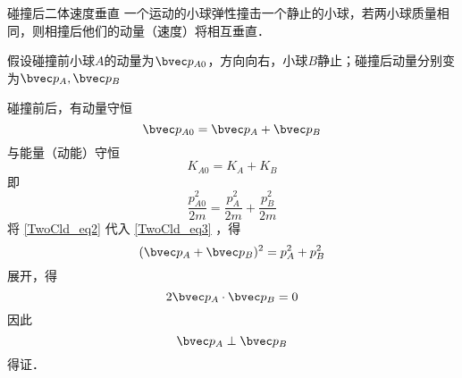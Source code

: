 \begin{example}{碰撞后二体速度垂直}
一个运动的小球弹性撞击一个静止的小球，若两小球质量相同，则相撞后他们的动量（速度）将相互垂直．

假设碰撞前小球$A$的动量为$\bvec p_{A0}$，方向向右，小球$B$静止；碰撞后动量分别变为$\bvec p_{A},\bvec p_{B}$

碰撞前后，有动量守恒
\begin{equation}\label{TwoCld_eq2}
\bvec p_{A0} = \bvec p_{A} + \bvec p_{B}
\end{equation}
与能量（动能）守恒
\begin{equation}
K_{A0} = K_{A} + K_{B}
\end{equation}
即
\begin{equation}
\frac{p_{A0}^2}{2m}=\frac{p_{A}^2}{2m}+\frac{p_{B}^2}{2m}
\end{equation}
将 \autoref{TwoCld_eq2} 代入 \autoref{TwoCld_eq3} ，得
\begin{equation}
(\bvec p_{A} + \bvec p_{B})^2=p_{A}^2+p_{B}^2
\end{equation}
展开，得
\begin{equation}
2\bvec p_{A} \cdot \bvec p_{B}=0
\end{equation}
因此
\begin{equation}
\bvec p_{A} \perp \bvec p_{B}
\end{equation}
得证．
\end{example}



